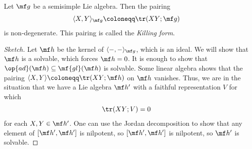 \documentclass{article}
\begin{document}
\begin{theorem}[Cartan] \label{thm:cartan-criteria}
	Let $\mf g$ be a semisimple Lie algebra. Then the pairing
	\[\langle X,Y\rangle_{\mf g}\coloneqq\tr(XY;\mf g)\]
	is non-degenerate. This pairing is called the \textit{Killing form}.
\end{theorem}
\begin{proof}[Sketch]
	Let $\mf h$ be the kernel of $\langle-,-\rangle_{\mf g}$, which is an ideal. We will show that $\mf h$ is a solvable, which forces $\mf h=0$. It is enough to show that $\op{ad}(\mf h)\subseteq\mf{gl}(\mf h)$ is solvable. Some linear algebra shows that the pairing $\langle X,Y\rangle\coloneqq\tr(XY;\mf h)$ on $\mf h$ vanishes. Thus, we are in the situation that we have a Lie algebra $\mf h'$ with a faithful representation $V$ for which
	\[\tr(XY;V)=0\]
	for each $X,Y\in\mf h'$. One can use the Jordan decomposition to show that any element of $[\mf h',\mf h']$ is nilpotent, so $[\mf h',\mf h']$ is nilpotent, so $\mf h'$ is solvable.
\end{proof}
\end{document}
